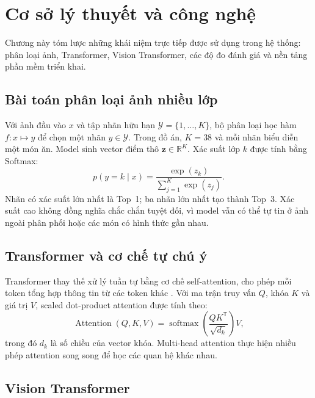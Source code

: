 \chapter{Cơ sở lý thuyết và công nghệ}
\label{ch:coso}

\begin{muctieu}
Chương này tóm lược những khái niệm trực tiếp được sử dụng trong hệ thống:
phân loại ảnh, Transformer, Vision Transformer, các độ đo đánh giá và nền
tảng phần mềm triển khai.
\end{muctieu}

\section{Bài toán phân loại ảnh nhiều lớp}

Với ảnh đầu vào $x$ và tập nhãn hữu hạn $\mathcal{Y}=\{1,\ldots,K\}$, bộ
phân loại học hàm $f:x\mapsto y$ để chọn một nhãn $y\in\mathcal{Y}$. Trong
đồ án, $K=38$ và mỗi nhãn biểu diễn một món ăn. Model sinh vector điểm thô
$\mathbf{z}\in\mathbb{R}^{K}$. Xác suất lớp $k$ được tính bằng Softmax:
\begin{equation}
p(y=k\mid x)=\frac{\exp(z_k)}{\sum_{j=1}^{K}\exp(z_j)}.
\label{eq:softmax}
\end{equation}
Nhãn có xác suất lớn nhất là Top~1; ba nhãn lớn nhất tạo thành Top~3. Xác
suất cao không đồng nghĩa chắc chắn tuyệt đối, vì model vẫn có thể tự tin ở
ảnh ngoài phân phối hoặc các món có hình thức gần nhau.

\section{Transformer và cơ chế tự chú ý}

Transformer thay thế xử lý tuần tự bằng cơ chế self-attention, cho phép mỗi
token tổng hợp thông tin từ các token khác \cite{vaswani2017attention}. Với
ma trận truy vấn $Q$, khóa $K$ và giá trị $V$, scaled dot-product attention
được tính theo:
\begin{equation}
\operatorname{Attention}(Q,K,V)=
\operatorname{softmax}\left(\frac{QK^{\mathsf T}}{\sqrt{d_k}}\right)V,
\label{eq:attention}
\end{equation}
trong đó $d_k$ là số chiều của vector khóa. Multi-head attention thực hiện
nhiều phép attention song song để học các quan hệ khác nhau.

\section{Vision Transformer}

